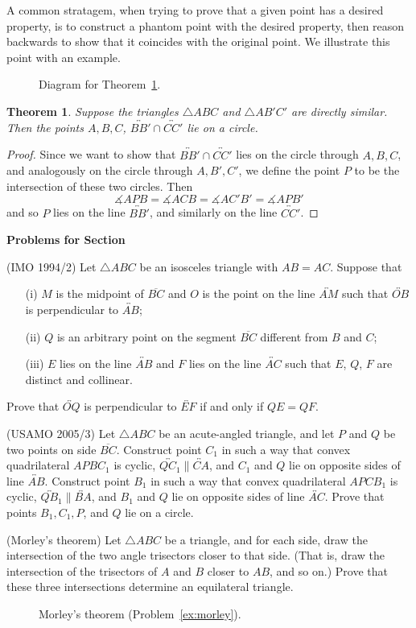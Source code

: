 \documentclass[12pt]{book}
\newcounter{exc}
\numberwithin{exc}{section}
\numberwithin{figure}{section}
\newenvironment{exer}{\vspace{0.1in}
\noindent \textbf{Problems for Section~\thesection} \vspace{0.1in}
\begin{list}{\arabic{exc}.}{\usecounter{exc}}}{\end{list}}
\newtheorem{theorem}{Theorem}[section]
\numberwithin{equation}{theorem}
\def\ii{\item}
\def\dang{\measuredangle} %
\def\line#1{\overleftrightarrow{#1}}
\def\seg#1{\overline{#1}}
\begin{document}
A common stratagem, when trying to prove that a given point has a
desired property, is to construct a phantom point with the desired
property, then reason backwards to show that it coincides with the
original point. We illustrate this point with an example.
\begin{figure}
\caption{Diagram for Theorem~\ref{thm:back1}.}
\end{figure}
\begin{theorem} \label{thm:back1}
Suppose the triangles $\triangle ABC$ and $\triangle
AB'C'$ are directly similar. Then 
the points $A, B, C$, $\line{BB'} \cap \line{CC'}$ lie on a circle.
\end{theorem}
\begin{proof}
Since we want to show that $\line{BB'} \cap \line{CC'}$ lies on the circle through
$A, B, C$, and analogously on the circle through $A, B', C'$, we
define the point $P$ to be the intersection of these two circles. Then
\[
\dang APB = \dang ACB = \dang AC'B' = \dang APB'
\]
and so $P$ lies on the line $\line{BB'}$, and similarly on the line 
$\line{CC'}$.
\end{proof}

\begin{exer}
\ii (IMO 1994/2) \label{ex:imo94}
Let $\triangle ABC$ be an isosceles triangle with $AB = AC$. Suppose that
\begin{enumerate}
        \item[(i)]  $M$ is the midpoint of $\seg{BC}$ and $O$ is the point on the line 
        $\line{AM}$ such that $\line{OB}$ is perpendicular to $\line{AB}$;

        \item[(ii)]  $Q$ is an arbitrary point on the segment $\seg{BC}$ different from 
        $B$ and $C$;

        \item[(iii)]  $E$ lies on the line $\line{AB}$ and $F$ lies on the line $\line{AC}$ 
        such that $E$, $Q$, $F$ are distinct and collinear.
\end{enumerate}
Prove that $\line{OQ}$ is perpendicular to $\line{EF}$ if and only if $QE = QF$.
\ii (USAMO 2005/3)
Let $\triangle ABC$ be an acute-angled triangle, and let $P$ and $Q$ be two
points on side $\seg{BC}$. Construct point $C_1$ in such a way that
convex quadrilateral $APBC_1$ is cyclic, $\line{QC_1}
\parallel \line{CA}$, and $C_1$ and $Q$ lie on opposite sides of line
$\line{AB}$. Construct point $B_1$ in such a way that convex
quadrilateral $APCB_1$ is cyclic, $\line{QB_1} \parallel \line{BA}$, and $B_1$
and $Q$  lie on opposite sides of line $\line{AC}$.  Prove that points
$B_1, C_1,P$, and $Q$ lie on a circle.
\ii (Morley's theorem) \label{ex:morley} 
Let $\triangle ABC$ be a triangle, and for each side, draw the intersection of 
the two angle trisectors closer to that side. (That is, draw the 
intersection of the trisectors of $A$ and $B$ closer to $AB$, 
and so on.) Prove that these three intersections determine an 
equilateral triangle. 
\begin{figure}[ht]
\caption{Morley's theorem (Problem~\ref{ex:morley}).}
\end{figure}
\end{exer}
\end{document}
